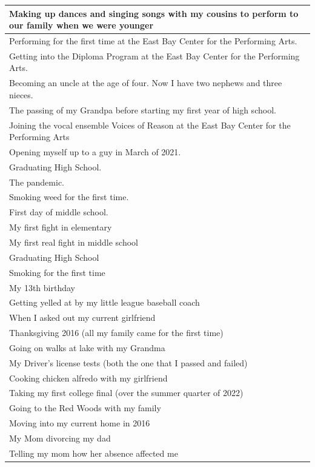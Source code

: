 \documentclass[
  .7em,
  letterpaper,
  DIV=11,
  numbers=noendperiod]{scrartcl}
\begin{document}
\begin{table}
\begin{tabular}{l}
\hline
Making up dances and singing songs with my cousins to perform to our family when we were younger\\
\hline
Performing for the first time at the East Bay Center for the Performing Arts.\\
\hline
Getting into the Diploma Program at the East Bay Center for the Performing Arts.\\
\hline
Becoming an uncle at the age of four. Now I have two nephews and three nieces.\\
\hline
The passing of my Grandpa before starting my first year of high school.\\
\hline
Joining the vocal ensemble Voices of Reason at the East Bay Center for the Performing Arts\\
\hline
Opening myself up to a guy in March of 2021.\\
\hline
Graduating High School.\\
\hline
The pandemic.\\
\hline
Smoking weed for the first time.\\
\hline
First day of middle school.\\
\hline
My first fight in elementary\\
\hline
My first real fight in middle school\\
\hline
Graduating High School\\
\hline
Smoking for the first time\\
\hline
My 13th birthday\\
\hline
Getting yelled at by my little league baseball coach\\
\hline
When I asked out my current girlfriend\\
\hline
Thanksgiving 2016 (all my family came for the first time)\\
\hline
Going on walks at lake with my Grandma\\
\hline
My Driver's license tests (both the one that I passed and failed)\\
\hline
Cooking chicken alfredo with my girlfriend\\
\hline
Taking my first college final (over the summer quarter of 2022)\\
\hline
Going to the Red Woods with my family\\
\hline
Moving into my current home in 2016\\
\hline
My Mom divorcing my dad\\
\hline
Telling my mom how her absence affected me\\

\end{tabular}
\end{table}
\end{document}
